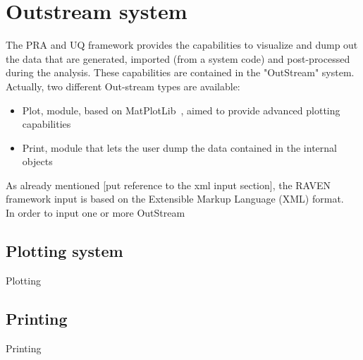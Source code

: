 \section{Outstream system}
The PRA and UQ framework provides the capabilities to visualize and dump out the data that are  generated, imported (from a system code) and post-processed during the analysis. These capabilities are contained in the "OutStream" system. Actually, two different Out-stream types are available:
\vspace{-5mm}
\begin{itemize}
\itemsep0em
\item Plot, module, based on MatPlotLib~\cite{MatPlotLib}, aimed to provide advanced plotting capabilities 
\item Print, module that lets the user dump the data contained in the internal objects 
\end{itemize}
\vspace{-5mm}
As already mentioned [put reference to the xml input section], the RAVEN framework input is based on the Extensible Markup Language (XML) format. 
\\In order to input one or more OutStream  

\subsection{Plotting system \label{sec:plotting}}
Plotting

\subsection{Printing \label{sec:printing}}
Printing




